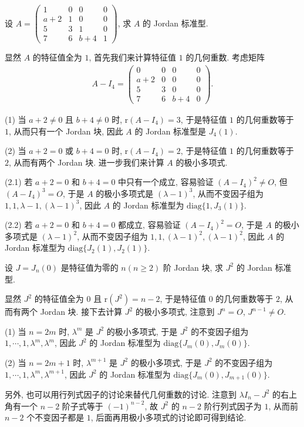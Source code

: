 \documentclass[../../main.tex]{subfiles}
\begin{document}
\begin{example}
设 $A = \begin{pmatrix}
1 & 0 & 0 & 0 \\
a + 2 & 1 & 0 & 0 \\
5 & 3 & 1 & 0 \\
7 & 6 & b + 4 & 1
\end{pmatrix}$, 求 $A$ 的 Jordan 标准型.
\end{example}
\begin{solution}
显然 $A$ 的特征值全为 $1$, 首先我们来计算特征值 $1$ 的几何重数. 考虑矩阵
\begin{align*}
A - I_4 = \begin{pmatrix}
0 & 0 & 0 & 0 \\
a + 2 & 0 & 0 & 0 \\
5 & 3 & 0 & 0 \\
7 & 6 & b + 4 & 0
\end{pmatrix}.
\end{align*}

(1) 当 $a + 2 \neq 0$ 且 $b + 4 \neq 0$ 时, $\mathrm{r}(A - I_4) = 3$, 于是特征值 $1$ 的几何重数等于 $1$, 从而只有一个 Jordan 块, 因此 $A$ 的 Jordan 标准型是 $J_4(1)$.

(2) 当 $a + 2 = 0$ 或 $b + 4 = 0$ 时, $\mathrm{r}(A - I_4) = 2$, 于是特征值 $1$ 的几何重数等于 $2$, 从而有两个 Jordan 块. 进一步我们来计算 $A$ 的极小多项式.

(2.1) 若 $a + 2 = 0$ 和 $b + 4 = 0$ 中只有一个成立, 容易验证 $(A - I_4)^2 \neq O$, 但 $(A - I_4)^3 = O$, 于是 $A$ 的极小多项式是 $(\lambda - 1)^3$, 从而不变因子组为 $1,1,\lambda - 1,(\lambda - 1)^3$, 因此 $A$ 的 Jordan 标准型为 $\mathrm{diag}\{1,J_3(1)\}$.

(2.2) 若 $a + 2 = 0$ 和 $b + 4 = 0$ 都成立, 容易验证 $(A - I_4)^2 = O$, 于是 $A$ 的极小多项式是 $(\lambda - 1)^2$, 从而不变因子组为 $1,1,(\lambda - 1)^2,(\lambda - 1)^2$, 因此 $A$ 的 Jordan 标准型为 $\mathrm{diag}\{J_2(1),J_2(1)\}$. 
\end{solution}

\begin{example}\label{example:J_n(0)的Jordan标准型}
设 $J = J_n(0)$ 是特征值为零的 $n(n \geq 2)$ 阶 Jordan 块, 求 $J^2$ 的 Jordan 标准型.
\end{example}
\begin{solution}
显然 $J^2$ 的特征值全为 $0$ 且 $\mathrm{r}(J^2) = n - 2$, 于是特征值 $0$ 的几何重数等于 $2$, 从而有两个 Jordan 块. 接下去计算 $J^2$ 的极小多项式, 注意到 $J^n = O$, $J^{n - 1} \neq O$.

(1) 当 $n = 2m$ 时, $\lambda^m$ 是 $J^2$ 的极小多项式, 于是 $J^2$ 的不变因子组为 $1,\cdots,1,\lambda^m,\lambda^m$, 因此 $J^2$ 的 Jordan 标准型为 $\mathrm{diag}\{J_m(0),J_m(0)\}$.

(2) 当 $n = 2m + 1$ 时, $\lambda^{m + 1}$ 是 $J^2$ 的极小多项式, 于是 $J^2$ 的不变因子组为 $1,\cdots,1,\lambda^m,\lambda^{m + 1}$, 因此 $J^2$ 的 Jordan 标准型为 $\mathrm{diag}\{J_m(0),J_{m + 1}(0)\}$.

另外, 也可以用行列式因子的讨论来替代几何重数的讨论. 注意到 $\lambda I_n - J^2$ 的右上角有一个 $n - 2$ 阶子式等于 $(-1)^{n - 2}$, 故 $J^2$ 的 $n - 2$ 阶行列式因子为 $1$, 从而前 $n - 2$ 个不变因子都是 $1$, 后面再用极小多项式的讨论即可得到结论.
\end{solution}
\end{document}
